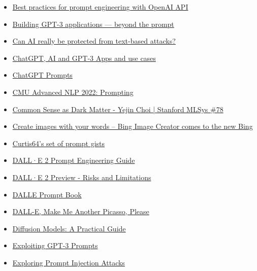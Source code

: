 \begin{itemize}
  \item \href{https://help.openai.com/en/articles/6654000-best-practices-for-prompt-engineering-with-openai-api}{Best practices for prompt engineering with OpenAI API}
  \item \href{https://medium.com/data-science-at-microsoft/building-gpt-3-applications-beyond-the-prompt-504140835560}{Building GPT-3 applications — beyond the prompt}
  \item \href{https://techcrunch.com/2023/02/24/can-language-models-really-be-protected-from-text-based-attacks/}{Can AI really be protected from text-based attacks?}
  \item \href{https://gpt3demo.com}{ChatGPT, AI and GPT-3 Apps and use cases}
  \item \href{https://twitter.com/aaditsh/status/1636398208648658945?s=20}{ChatGPT Prompts}
  \item \href{https://youtube.com/watch?v=5ef83Wljm-M&feature=shares}{CMU Advanced NLP 2022: Prompting}
  \item \href{https://youtube.com/live/n4HakBqoCVg?feature=shares}{Common Sense as Dark Matter - Yejin Choi | Stanford MLSys \#78}
  \item \href{https://blogs.microsoft.com/blog/2023/03/21/create-images-with-your-words-bing-image-creator-comes-to-the-new-bing/}{Create images with your words – Bing Image Creator comes to the new Bing}
  \item \href{https://gist.github.com/Curtis-64}{Curtis64's set of prompt gists}
  \item \href{https://docs.google.com/document/d/11WlzjBT0xRpQhP9tFMtxzd0q6ANIdHPUBkMV-YB043U/edit#}{DALL·E 2 Prompt Engineering Guide}
  \item \href{https://github.com/openai/dalle-2-preview/blob/main/system-card.md}{DALL·E 2 Preview - Risks and Limitations}
  \item \href{https://dallery.gallery/the-dalle-2-prompt-book}{DALLE Prompt Book}
  \item \href{https://www.newyorker.com/magazine/2022/07/11/dall-e-make-me-another-picasso-please?}{DALL-E, Make Me Another Picasso, Please}
  \item \href{https://scale.com/guides/diffusion-models-guide}{Diffusion Models: A Practical Guide}
  \item \href{https://twitter.com/goodside/status/1569128808308957185}{Exploiting GPT-3 Prompts}
  \item \href{https://research.nccgroup.com/2022/12/05/exploring-prompt-injection-attacks}{Exploring Prompt Injection Attacks}

\end{itemize}
